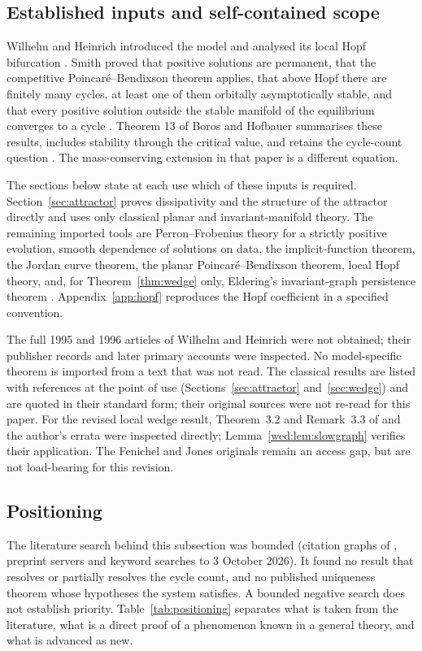 \subsection{Established inputs and self-contained scope}
Wilhelm and Heinrich introduced the model and analysed its local Hopf bifurcation \cite{WH95,WH96}. Smith proved that positive solutions are permanent, that the competitive Poincar\'e--Bendixson theorem applies, that above Hopf there are finitely many cycles, at least one of them orbitally asymptotically stable, and that every positive solution outside the stable manifold of the equilibrium converges to a cycle \cite[Theorems 1.1, 1.3 and 1.4]{Smith12}. Theorem 13 of Boros and Hofbauer summarises these results, includes stability through the critical value, and retains the cycle-count question \cite{BH23}. The mass-conserving extension in that paper is a different equation.

The sections below state at each use which of these inputs is required. Section~\ref{sec:attractor} proves dissipativity and the structure of the attractor directly and uses only classical planar and invariant-manifold theory. The remaining imported tools are Perron--Frobenius theory for a strictly positive evolution, smooth dependence of solutions on data, the implicit-function theorem, the Jordan curve theorem, the planar Poincar\'e--Bendixson theorem, local Hopf theory, and, for Theorem~\ref{thm:wedge} only, Eldering's invariant-graph persistence theorem \cite{Eldering13}. Appendix~\ref{app:hopf} reproduces the Hopf coefficient in a specified convention.

The full 1995 and 1996 articles of Wilhelm and Heinrich were not obtained; their publisher records and later primary accounts were inspected. No model-specific theorem is imported from a text that was not read. The classical results are listed with references at the point of use (Sections~\ref{sec:attractor} and~\ref{sec:wedge}) and are quoted in their standard form; their original sources were not re-read for this paper. For the revised local wedge result, Theorem~3.2 and Remark~3.3 of \cite{Eldering13} and the author's errata were inspected directly; Lemma~\ref{wed:lem:slowgraph} verifies their application. The Fenichel and Jones originals remain an access gap, but are not load-bearing for this revision.

\subsection{Positioning}
The literature search behind this subsection was bounded (citation graphs of \cite{Smith12,BH23,WH95,WH96}, preprint servers and keyword searches to 3 October 2026). It found no result that resolves or partially resolves the cycle count, and no published uniqueness theorem whose hypotheses the system satisfies. A bounded negative search does not establish priority. Table~\ref{tab:positioning} separates what is taken from the literature, what is a direct proof of a phenomenon known in a general theory, and what is advanced as new.

